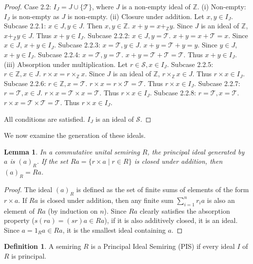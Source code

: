 \documentclass[11pt, a4paper]{article}
\theoremstyle{plain}
\newtheorem{lemma}[theorem]{Lemma}
\theoremstyle{definition}
\newtheorem{definition}[theorem]{Definition}
\numberwithin{equation}{section}
\newcommand{\Z}{\mathbb{Z}}
\newcommand{\Tobj}{\mathcal{T}} %
\newcommand{\SemiringS}{\mathcal{S}}
\begin{document}
\begin{proof}
Case 2.2: $I_J = J \cup \{\Tobj\}$, where $J$ is a non-empty ideal of $\Z$.
(i) Non-empty: $I_J$ is non-empty as $J$ is non-empty.
(ii) Closure under addition. Let $x, y \in I_J$.
Subcase 2.2.1: $x \in J, y \in J$. Then $x, y \in \Z$. $x+y = x+_{\Z} y$. Since $J$ is an ideal of $\Z$, $x+_{\Z} y \in J$. Thus $x+y \in I_J$.
Subcase 2.2.2: $x \in J, y=\Tobj$. $x+y = x+\Tobj = x$. Since $x \in J$, $x+y \in I_J$.
Subcase 2.2.3: $x=\Tobj, y \in J$. $x+y = \Tobj+y = y$. Since $y \in J$, $x+y \in I_J$.
Subcase 2.2.4: $x=\Tobj, y=\Tobj$. $x+y = \Tobj+\Tobj = \Tobj$. Thus $x+y \in I_J$.
(iii) Absorption under multiplication. Let $r \in \SemiringS, x \in I_J$.
Subcase 2.2.5: $r \in \Z, x \in J$. $r\times x = r\times_{\Z} x$. Since $J$ is an ideal of $\Z$, $r\times_{\Z} x \in J$. Thus $r\times x \in I_J$.
Subcase 2.2.6: $r \in \Z, x=\Tobj$. $r\times x = r\times\Tobj = \Tobj$. Thus $r\times x \in I_J$.
Subcase 2.2.7: $r=\Tobj, x \in J$. $r\times x = \Tobj\times x = \Tobj$. Thus $r\times x \in I_J$.
Subcase 2.2.8: $r=\Tobj, x=\Tobj$. $r\times x = \Tobj\times\Tobj = \Tobj$. Thus $r\times x \in I_J$.

All conditions are satisfied. $I_J$ is an ideal of $\SemiringS$.
\end{proof}

We now examine the generation of these ideals.

\begin{lemma}\label{lem:principal_ideal_structure}
In a commutative unital semiring $R$, the principal ideal generated by $a$ is $(a)_R$. If the set $Ra=\{r\times a \mid r \in R\}$ is closed under addition, then $(a)_R = Ra$.
\end{lemma}
\begin{proof}
The ideal $(a)_R$ is defined as the set of finite sums of elements of the form $r\times a$. If $Ra$ is closed under addition, then any finite sum $\sum_{i=1}^n r_i a$ is also an element of $Ra$ (by induction on $n$). Since $Ra$ clearly satisfies the absorption property ($s(ra)=(sr)a \in Ra$), if it is also additively closed, it is an ideal. Since $a=1_R a \in Ra$, it is the smallest ideal containing $a$.
\end{proof}

\begin{definition}
A semiring $R$ is a Principal Ideal Semiring (PIS) if every ideal $I$ of $R$ is principal.
\end{definition}
\end{document}
